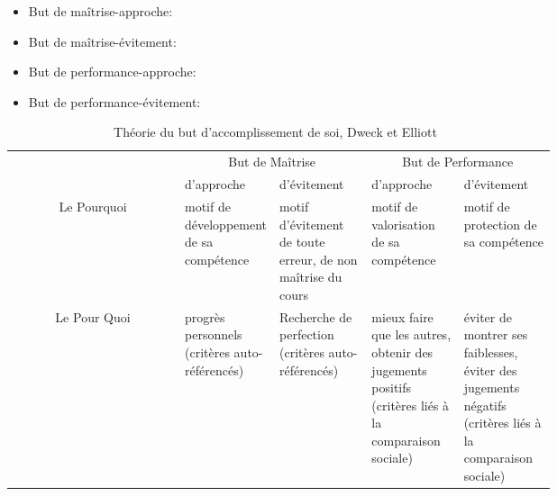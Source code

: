         \begin{itemize}\myItemStyle
            \item But de maîtrise-approche: 
            \item But de maîtrise-évitement: 
            \item But de performance-approche: 
            \item But de performance-évitement: 
        \end{itemize}\par%
        \begin{table}[!h]
        \footnotesize{}
            \centering
            \begin{tabular}{|c|p{0.175\linewidth}|p{0.175\linewidth}||p{0.175\linewidth}|p{0.175\linewidth}|}
            \hline
                 & \multicolumn{2}{c||}{But de Maîtrise} & \multicolumn{2}{c|}{But de Performance}\\ 
                 & d’approche & d’évitement & d’approche & d’évitement \\ \hline
                Le Pourquoi & motif de développement de sa compétence & motif d’évitement de toute erreur, de non maîtrise du cours & motif de valorisation de sa compétence & motif de protection de sa compétence \\ \hline
                Le Pour Quoi & progrès personnels (critères auto-référencés) & Recherche de perfection (critères auto-référencés) & mieux faire que les autres, obtenir des jugements positifs (critères liés à la comparaison sociale) & éviter de montrer ses faiblesses, éviter des jugements négatifs (critères liés à la comparaison sociale) \\ \hline
            \end{tabular}
            \caption{Théorie du but d’accomplissement de soi, Dweck et Elliott~}
            \label{tab:acc-de-soi}
        \end{table}\par%
